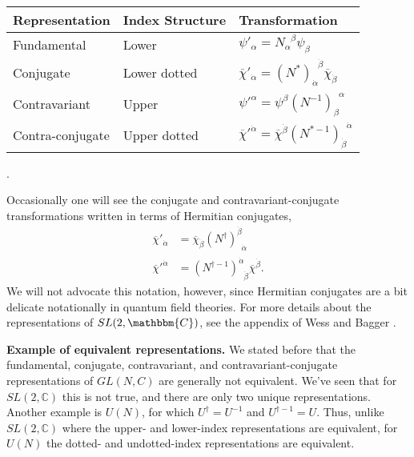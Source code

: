 \documentclass[12pt]{article}
\numberwithin{equation}{section}    %
\begin{document}
\begin{center}
	\begin{tabular}{|lll|}
		\hline
		\textbf{Representation} & \textbf{Index Structure} & \textbf{Transformation}\\
		\hline
		Fundamental & Lower & $\psi'_\alpha = N_\alpha^{\phantom\alpha\beta}\psi_\beta$\\
		Conjugate & Lower dotted & $\overline\chi'_{\dot\alpha} = (N^*)_{\dot\alpha}^{\phantom\alpha\dot\beta}\overline\chi_{\dot\beta}$\\
		Contravariant & Upper & $	\psi'^\alpha = \psi^\beta(N^{-1})_\beta^{\phantom\beta\alpha}$\\
		Contra-conjugate & Upper dotted & $\overline\chi'^{\dot\alpha} = \overline\chi^{\dot\beta}(N^{*-1})_{\dot\beta}^{\phantom\beta\dot\alpha}$\\
		\hline
	\end{tabular}.	
\end{center}
Occasionally one will see the conjugate and contravariant-conjugate transformations written in terms of Hermitian conjugates,
\begin{align}
	\overline\chi'_{\dot\alpha} &= \overline\chi_{\dot\beta}(N^\dag)_{\phantom\beta\dot\alpha}^{\dot\beta}\label{eq:SUSYalg:reps:2p}\\
	\overline\chi'^{\dot\alpha} &= (N^{\dag-1})_{\phantom\alpha\dot\beta}^{\dot\alpha}\overline\chi^{\dot\beta}.\label{eq:SUSYalg:reps:4p}
\end{align}
We will not advocate this notation, however, since Hermitian conjugates are a bit delicate notationally in quantum field theories. For more details about the representations of $SL(2,\mathbbm{C})$, see the appendix of Wess and Bagger \cite{Wess:1992cp}.

\vspace{.5em}
\begin{framed}
	\noindent\textbf{Example of equivalent representations.} We stated before that the fundamental, conjugate, contravariant, and contravariant-conjugate representations of $GL(N,C)$ are generally not equivalent. We've seen that for $SL(2,\mathbb{C})$ this is not true, and there are only two unique representations. Another example is $U(N)$, for which $U^\dag = U^{-1}$ and $U^{\dag-1} = U$. Thus, unlike $SL(2,\mathbb{C})$ where the upper- and lower-index representations are equivalent, for $U(N)$ the dotted- and undotted-index representations are equivalent.
\end{framed}
\vspace{.5em}
\end{document}
